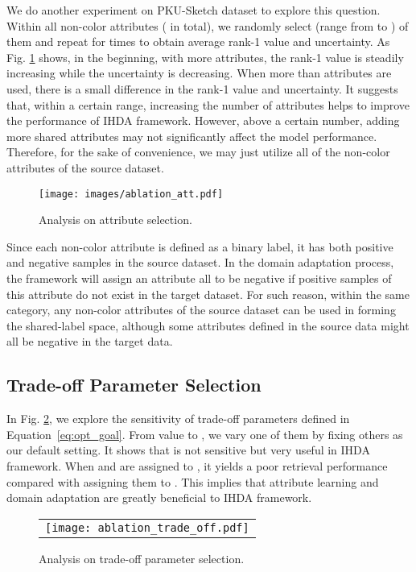 \documentclass[journal]{IEEEtran}
\begin{document}
We do another experiment on PKU-Sketch dataset to explore this question. Within all non-color attributes ( in total), we randomly select  (range from  to ) of them and repeat for  times to obtain average rank-1 value and uncertainty. As Fig. \ref{fig:ablation_att} shows, 
in the beginning, with more attributes, the rank-1 value is steadily increasing while the uncertainty is decreasing. When more than  attributes are used, there is a small difference in the rank-1 value and uncertainty. It suggests that, within a certain range, increasing the number of attributes helps to improve the performance of IHDA framework. However, above a certain number, adding more shared attributes may not significantly affect the model performance. Therefore, for the sake of convenience, we may just utilize all of the non-color attributes of the source dataset. 

\begin{figure}[h!]
\centering 
\texttt{[image: images/ablation\_att.pdf]}
\caption{Analysis on attribute selection.}
\label{fig:ablation_att}
\end{figure}


Since each non-color attribute is defined as a binary label, it has both positive and negative samples in the source dataset. In the domain adaptation process, the framework will assign an attribute all to be negative if positive samples of this attribute do not exist in the target dataset. For such reason, within the same category, any non-color attributes of the source dataset can be used in forming the shared-label space, although some attributes defined in the source data might all be negative in the target data.


\subsection{Trade-off Parameter Selection}
In Fig. \ref{fig:trade-off}, we explore the sensitivity of trade-off parameters defined in Equation~\ref{eq:opt_goal}. From value  to , we vary one of them by fixing others as our default setting. It shows that  is not sensitive but very useful in IHDA framework. When  and  are assigned to , it yields a poor retrieval performance compared with assigning them to . This implies that attribute learning and domain adaptation are greatly beneficial to IHDA framework.

\tabcolsep=3pt
\begin{figure}[h!]
\centering 
\begin{tabular}{c}
\texttt{[image: ablation\_trade\_off.pdf]} \\
\end{tabular}
\caption{Analysis on trade-off parameter selection.}
\label{fig:trade-off}
\end{figure}
\end{document}

